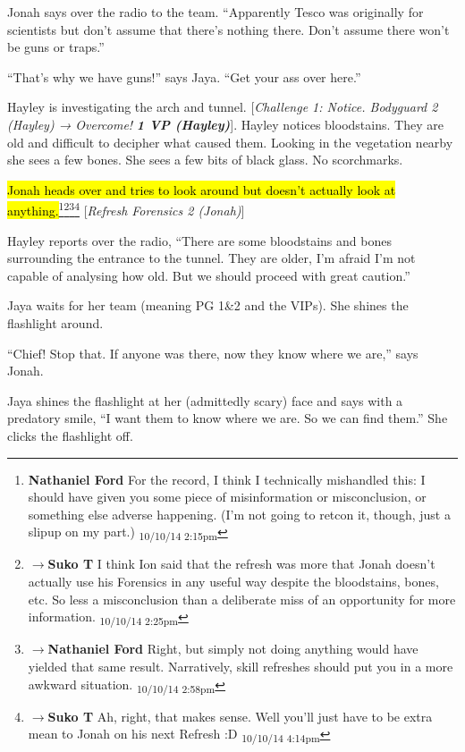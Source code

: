 Jonah says over the radio to the team.  ``Apparently Tesco was originally for scientists but don't assume that there's nothing there.  Don't assume there won't be guns or traps.''

``That's why we have guns!'' says Jaya.  ``Get your ass over here.''

Hayley is investigating the arch and tunnel.  {[}\textit{Challenge 1: Notice.  Bodyguard 2 (Hayley) → Overcome! }\textit{\textbf{1 VP (Hayley)}}{]}.   Hayley notices bloodstains.  They are old and difficult to decipher what caused them.  Looking in the vegetation nearby she sees a few bones.  She sees a few bits of black glass.  No scorchmarks.

\hl{Jonah heads over and tries to look around but doesn't actually look at anything.}\footnote{\textbf{Nathaniel Ford }For the record, I think I technically mishandled this: I should have given you some piece of misinformation or misconclusion, or something else adverse happening. (I'm not going to retcon it, though, just a slipup on my part.) \textsubscript{10/10/14 2:15pm}}\footnote{$\rightarrow$\textbf{Suko T }I think Ion said that the refresh was more that Jonah doesn't actually use his Forensics in any useful way despite the bloodstains, bones, etc.  So less a misconclusion than a deliberate miss of an opportunity for more information. \textsubscript{10/10/14 2:25pm}}\footnote{$\rightarrow$\textbf{Nathaniel Ford }Right, but simply not doing anything would have yielded that same result. Narratively, skill refreshes should put you in a more awkward situation. \textsubscript{10/10/14 2:58pm}}\footnote{$\rightarrow$\textbf{Suko T }Ah, right, that makes sense. Well you'll just have to be extra mean to Jonah on his next Refresh :D \textsubscript{10/10/14 4:14pm}} {[}\textit{Refresh Forensics 2 (Jonah)}{]}

Hayley reports over the radio, ``There are some bloodstains and bones surrounding the entrance to the tunnel.  They are older, I'm afraid I'm not capable of analysing how old.  But we should proceed with great caution.''

Jaya waits for her team (meaning PG 1\&2 and the VIPs).  She shines the flashlight around.

``Chief!  Stop that.  If anyone was there, now they know where we are,'' says Jonah.

Jaya shines the flashlight at her (admittedly scary) face and says with a predatory smile, ``I want them to know where we are.  So we can find them.'' She clicks the flashlight off.



